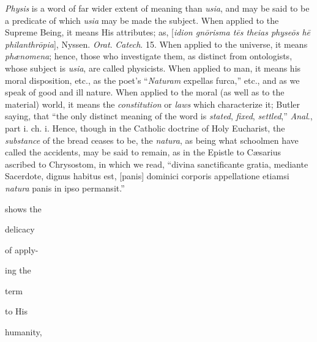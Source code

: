 \emph{Physis}
is a word of far wider extent of meaning than \emph{usia}, and
may be said to be a predicate of which \emph{usia} may be made
the subject. When applied to the Supreme Being, it means His
attributes; as, [\emph{idion gn\={o}risma t\={e}s theias
physe\={o}s h\={e} philanthr\={o}pia}], Nyssen. \emph{Orat}.
\emph{Catech}. 15. When applied to the universe, it means \emph{phænomena};
hence, those who investigate them, as distinct from
ontologists, whose subject is \emph{usia}, are called
physicists. When applied to man, it means his moral
disposition, etc., as the poet's ``\emph{Naturam} expellas
furca,'' etc., and as we speak of good and ill nature. When
applied to the moral (as well as to the material) world, it
means the \emph{constitution} or \emph{laws} which
characterize it; Butler saying, that ``the only distinct
meaning of the word is \emph{stated}, \emph{fixed}, \emph{settled},''
\emph{Anal}., part i. ch. i. Hence, though in the Catholic
doctrine of Holy Eucharist, the \emph{substance} of the bread
ceases to be, the \emph{natura}, as being what schoolmen have
called the accidents, may be said to remain, as in the Epistle
to Cæsarius ascribed to Chrysostom, in which we read, ``divina
sanctificante gratia, mediante Sacerdote, dignus habitus est,
[panis] dominici corporis appellatione etiamsi \emph{natura}
panis in ipso permansit.''

shows the

delicacy

of apply-

ing the

term

to His

humanity,

